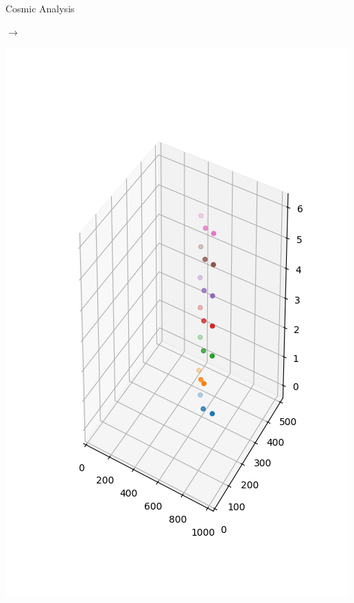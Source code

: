 \documentclass{beamer}
\begin{document}
\begin{frame}[fragile]{Cosmic Analysis}
\begin{minipage}{.30\textwidth}
\end{minipage}
\begin{minipage}{.1\textwidth}
    \centering
    \( \rightarrow \)
\end{minipage}
\begin{minipage}{.30\textwidth}
    \centering
    \includegraphics[trim=0 50 0 100,clip,width=\textwidth]{DESY_After.png}
\end{minipage}
\end{frame}
\end{document}
